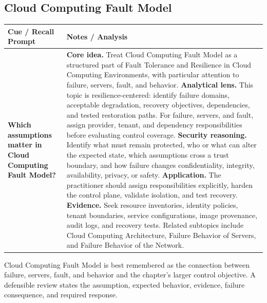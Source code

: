 \documentclass[11pt]{article}
\newcommand{\CornellHeader}{%
\rowcolor{Navy}\color{white}\bfseries Cue / Recall Prompt & \color{white}\bfseries Notes / Analysis\\\hline}
\newcommand{\CornellRow}[2]{%
\cellcolor{CueGray}\RaggedRight\textbf{#1} & \RaggedRight #2\\\hline}
\begin{document}
\subsection*{Cloud Computing Fault Model}
\begin{longtable}{>{\RaggedRight\arraybackslash}p{}|>{\RaggedRight\arraybackslash}p{}}
\CornellHeader
\CornellRow{Which assumptions matter in Cloud Computing Fault Model?}{\textbf{Core idea.} Treat Cloud Computing Fault Model as a structured part of Fault Tolerance and Resilience in Cloud Computing Environments, with particular attention to failure, servers, fault, and behavior. \textbf{Analytical lens.} This topic is resilience-centered: identify failure domains, acceptable degradation, recovery objectives, dependencies, and tested restoration paths. For failure, servers, and fault, assign provider, tenant, and dependency responsibilities before evaluating control coverage. \textbf{Security reasoning.} Identify what must remain protected, who or what can alter the expected state, which assumptions cross a trust boundary, and how failure changes confidentiality, integrity, availability, privacy, or safety. \textbf{Application.} The practitioner should assign responsibilities explicitly, harden the control plane, validate isolation, and test recovery. \textbf{Evidence.} Seek resource inventories, identity policies, tenant boundaries, service configurations, image provenance, audit logs, and recovery tests. Related subtopics include Cloud Computing Architecture, Failure Behavior of Servers, and Failure Behavior of the Network.}
\end{longtable}
\begin{topicsummary}
Cloud Computing Fault Model is best remembered as the connection between failure, servers, fault, and behavior and the chapter's larger control objective. A defensible review states the assumption, expected behavior, evidence, failure consequence, and required response.
\end{topicsummary}
\end{document}
